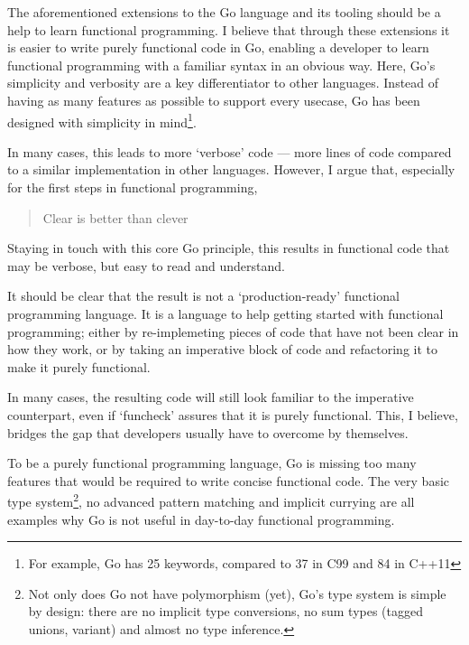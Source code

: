 
The aforementioned extensions to the Go language and its tooling should be a help to learn
functional programming. I believe that through these extensions it is easier to write
purely functional code in Go, enabling a developer to learn functional programming with
a familiar syntax in an obvious way. Here, Go's simplicity and verbosity are a key differentiator
to other languages. Instead of having as many features as possible to support every usecase,
Go has been designed with simplicity in mind\footnote{For example, Go has 25 keywords, compared
to 37 in C99 and 84 in C++11}.

In many cases, this leads to more `verbose' code --- more lines of code compared to a similar
implementation in other languages. However, I argue that, especially for the first steps
in functional programming,

\begin{quote}
Clear is better than clever\autocite{cheney-clear}
\end{quote}

Staying in touch with this core Go principle, this results in functional code that may be
verbose, but easy to read and understand.

It should be clear that the result is not a `production-ready' functional programming language.
It is a language to help getting started with functional programming; either by re-implemeting pieces
of code that have not been clear in how they work, or by taking an imperative block of code
and refactoring it to make it purely functional.

In many cases, the resulting code will still look familiar to the imperative counterpart,
even if `funcheck' assures that it is purely functional. This, I believe, bridges the gap
that developers usually have to overcome by themselves.

To be a purely functional programming language, Go is missing too many features that would be
required to write concise functional code. The very basic type system\footnote{Not only
	does Go not have polymorphism (yet), Go's type system is simple by design: there are no
	implicit type conversions, no sum types (tagged unions, variant) and almost no type inference.
}, no advanced pattern matching and implicit currying are all examples why Go is not useful
in day-to-day functional programming.

